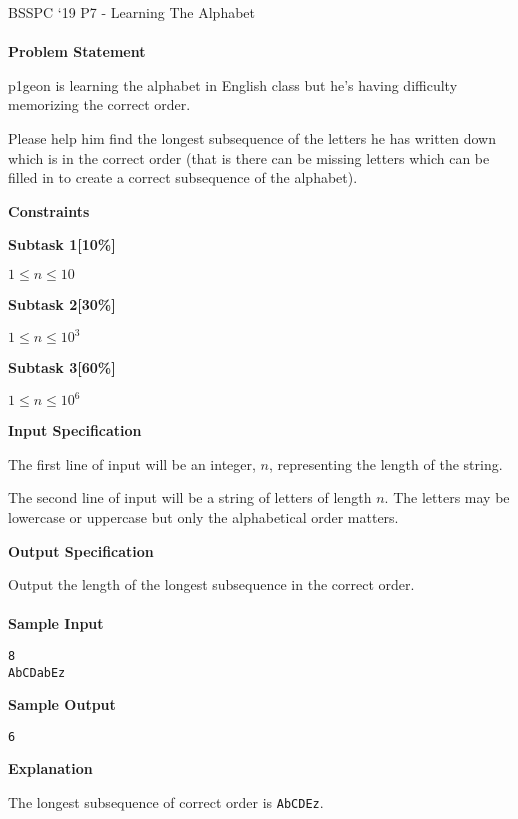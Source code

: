 \documentclass[]{article}
\begin{document}
{\Large BSSPC ‘19 P7 - Learning The Alphabet}
\\\\
\textbf{\large Problem Statement}
\par
p1geon is learning the alphabet in English class but he’s having difficulty memorizing the correct order. 
\par
Please help him find the longest subsequence of the letters he has written down which is in the correct order (that is there can be missing letters which can be filled in to create a correct subsequence of the alphabet).

\textbf{\large Constraints}
\par
\textbf{Subtask 1[10\%]}
\par
$1 \le n \le 10$
\par
\textbf{Subtask 2[30\%]}
\par
$1 \le n \le 10^3$
\par
\textbf{Subtask 3[60\%]}
\par
$1 \le n \le 10^6$

\textbf{\large Input Specification}
\par
The first line of input will be an integer, $n$, representing the length of the string. 
\par
The second line of input will be a string of letters of length $n$. The letters may be lowercase or uppercase but only the alphabetical order matters.

\textbf{\large Output Specification}
\par
Output the length of the longest subsequence in the correct order.
\\\\
\textbf{\large Sample Input}
\begin{verbatim}
8
AbCDabEz
\end{verbatim}
\textbf{\large Sample Output}
\begin{verbatim}
6
\end{verbatim}
\textbf{\large Explanation}
\par
The longest subsequence of correct order is \texttt{AbCDEz}.

\thispagestyle{empty}
\end{document}
